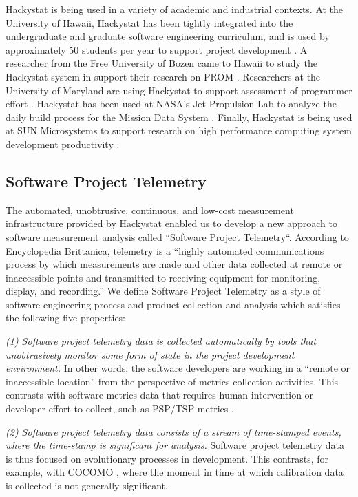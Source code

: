 Hackystat is being used in a variety of academic and industrial contexts.
At the University of Hawaii, Hackystat has been tightly integrated into the
undergraduate and graduate software engineering curriculum, and is
used by approximately 50 students per year to support project
development \cite{csdl2-03-12}.  A researcher from the Free University of
Bozen came to Hawaii to study the Hackystat system in support their research on
PROM \cite{Sillitti03}.  Researchers at the University of Maryland are
using Hackystat to support assessment of programmer effort
\cite{Hochstein05}.  Hackystat has been used at NASA's Jet Propulsion
Lab to analyze the daily build process for the Mission Data System
\cite{csdl2-03-07}.  Finally, Hackystat is being used at SUN Microsystems
to support research on high performance computing system development
productivity \cite{csdl2-04-03}.

\subsection {Software Project Telemetry}
\label{sec:telemetry}

The automated, unobtrusive, continuous, and low-cost measurement
infrastructure provided by Hackystat enabled us to develop a new approach
to software measurement analysis called ``Software Project Telemetry``. 
According to Encyclopedia Brittanica, telemetry is a ``highly automated
communications process by which measurements are made and other data
collected at remote or inaccessible points and transmitted to receiving
equipment for monitoring, display, and recording.''  We
define Software Project Telemetry as a style of software engineering
process and product collection and analysis which satisfies the following
five properties:

{\em (1) Software project telemetry data is collected automatically by tools
that unobtrusively monitor some form of state in the project development
environment.}  In other words, the software developers are working in a
``remote or inaccessible location'' from the perspective of metrics
collection activities. This contrasts with software metrics data that
requires human intervention or developer effort to collect, such as PSP/TSP
metrics \cite{Humphrey95}.
        
{\em (2) Software project telemetry data consists of a stream of
time-stamped events, where the time-stamp is significant for analysis.}
Software project telemetry data is thus focused on evolutionary processes
in development.  This contrasts, for example, with COCOMO \cite{Boehm00},
where the moment in time at which calibration data is collected is not
generally significant.

